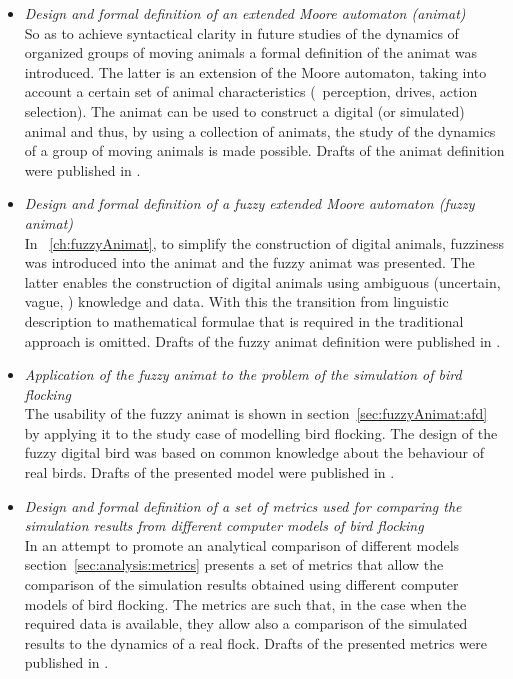 \begin{itemize}
%
  \item \emph{Design and formal definition of an extended Moore automaton (animat)}\\
  So as to achieve syntactical clarity in future studies of the dynamics of organized groups of moving animals a formal definition of the animat was introduced. The latter is an extension of the Moore automaton, taking into account a certain set of animal characteristics (\ie\ perception, drives, action selection). The animat can be used to construct a digital (or simulated) animal and thus, by using a collection of animats, the study of the dynamics of a group of moving animals is made possible. Drafts of the animat definition were published in \cite{lebar_bajec:2002,lebar_bajec:2003a,lebar_bajec:2003b,mraz:2004}.
%
  \item \emph{Design and formal definition of a fuzzy extended Moore automaton (fuzzy animat)}\\
  In \chaptername~\ref{ch:fuzzyAnimat}, to simplify the construction of digital animals, fuzziness was introduced into the animat and the fuzzy animat was presented. The latter enables the construction of digital animals using ambiguous (uncertain, vague, \etc) knowledge and data. With this the transition from linguistic description to mathematical formulae that is required in the traditional approach is omitted. Drafts of the fuzzy animat definition were published in \cite{lebar_bajec:2003a,lebar_bajec:2003b,mraz:2004}.
%
  \item \emph{Application of the fuzzy animat to the problem of the simulation of bird flocking}\\
  The usability of the fuzzy animat is shown in section~\ref{sec:fuzzyAnimat:afd} by applying it to the study case of modelling bird flocking. The design of the fuzzy digital bird was based on common knowledge about the behaviour of real birds. Drafts of the presented model were published in \cite{lebar_bajec:2003a,lebar_bajec:2003b,lebar_bajec:2005a}.
%
  \item \emph{Design and formal definition of a set of metrics used for comparing the simulation results from different computer models of bird flocking}\\
  In an attempt to promote an analytical comparison of different models section~\ref{sec:analysis:metrics} presents a set of metrics that allow the comparison of the simulation results obtained using different computer models of bird flocking. The metrics are such that, in the case when the required data is available, they allow also a comparison of the simulated results to the dynamics of a real flock. Drafts of the presented metrics were published in \cite{lebar_bajec:2002,lebar_bajec:2003a,lebar_bajec:2003b,lebar_bajec:2005a}.

\end{itemize}
